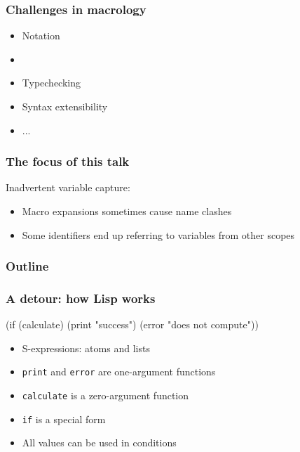 \documentclass[hyperref={bookmarks=false}]{beamer}
\begin{document}
\begin{frame}[fragile]
\frametitle{Challenges in macrology}

\begin{itemize}
\item Notation
\item \text{\color{blue}{Variable capture}}
\item Typechecking
\item Syntax extensibility
\item ...
\end{itemize}
\end{frame}

\begin{frame}[fragile]
\frametitle{The focus of this talk}

Inadvertent variable capture:
\begin{itemize}
\item Macro expansions sometimes cause name clashes
\item Some identifiers end up referring to variables from other scopes
\end{itemize}

\end{frame}



\begin{frame}
\frametitle{Outline}
\tableofcontents
\end{frame}

\begin{frame}[fragile]
\frametitle{A detour: how Lisp works}
\begin{semiverbatim}
(if (calculate)
  (print "success")
  (error "does not compute"))
\end{semiverbatim}

\vskip50pt

\begin{itemize}
\item S-expressions: atoms and lists
\item \texttt{print} and \texttt{error} are one-argument functions
\item \texttt{calculate} is a zero-argument function
\item \texttt{if} is a special form
\item All values can be used in conditions
\end{itemize}
\end{frame}
\end{document}
